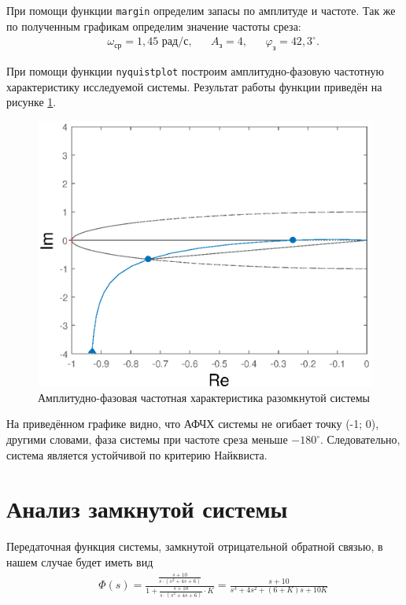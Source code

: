 \documentclass[fleqn, a4paper, 11pt, russian]{article}
\begin{document}
	При помощи функции \texttt{margin} определим запасы по амплитуде и частоте. Так же по полученным графикам определим значение частоты среза:
	\begin{align}
		&&\omega_\text{ср} = 1,45 \text{ рад/с}, &&A_\text{з} = 4, &&\varphi_\text{з} = 42,3^{\circ}.
	\end{align}
	
	При помощи функции \texttt{nyquistplot} построим амплитудно-фазовую частотную характеристику исследуемой системы. Результат работы функции приведён на рисунке \ref{opennyquist}.
	\begin{figure}[ht!]
		\centering
		\includegraphics[width = \textwidth]{Open/nyquist}
		\caption{Амплитудно-фазовая частотная характеристика разомкнутой системы}
		\label{opennyquist}
	\end{figure}
	
	На приведённом графике видно, что АФЧХ системы не огибает точку (-1; 0), другими словами, фаза системы при частоте среза меньше $-180^{\circ}.$ Следовательно, система является устойчивой по критерию Найквиста.
	\clearpage
	{\centering
		\section{Анализ замкнутой системы}
	}
	Передаточная функция системы, замкнутой отрицательной обратной связью, в нашем случае будет иметь вид
	\begin{align}
		&&\Phi(s) = \frac{\displaystyle{\frac{s + 10}{s\cdot(s^2 + 4s + 6)}}}{1 + \displaystyle{\frac{s + 10}{s\cdot(s^2 + 4s + 6)}}\cdot K} = \frac{s + 10}{s^3 + 4s^2 + (6 + K)s + 10K}
	\end{align}
	
\end{document}
